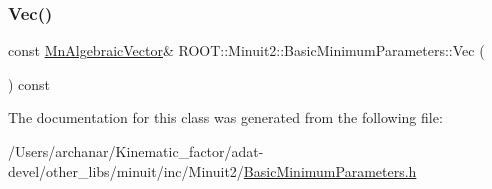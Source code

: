 \mbox{\label{classROOT_1_1Minuit2_1_1BasicMinimumParameters_ae8dc429aa9491e545efd916d4f72f8dd}} 
\subsubsection{\texorpdfstring{Vec()}{Vec()}\hspace{0.1cm}{\footnotesize\ttfamily [3/3]}}
{\footnotesize\ttfamily const \mbox{\hyperlink{namespaceROOT_1_1Minuit2_a62ed97730a1ca8d3fbaec64a19aa11c9}{Mn\+Algebraic\+Vector}}\& R\+O\+O\+T\+::\+Minuit2\+::\+Basic\+Minimum\+Parameters\+::\+Vec (\begin{DoxyParamCaption}{ }\end{DoxyParamCaption}) const\hspace{0.3cm}{\ttfamily [inline]}}



The documentation for this class was generated from the following file\+:\begin{DoxyCompactItemize}
\item 
/\+Users/archanar/\+Kinematic\+\_\+factor/adat-\/devel/other\+\_\+libs/minuit/inc/\+Minuit2/\mbox{\hyperlink{adat-devel_2other__libs_2minuit_2inc_2Minuit2_2BasicMinimumParameters_8h}{Basic\+Minimum\+Parameters.\+h}}\end{DoxyCompactItemize}
